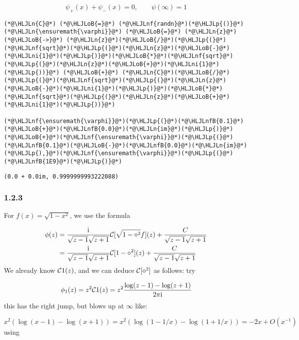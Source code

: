 \documentclass[12pt,landscape]{article}
\newcommand{\HLJLn}[1]{#1}
\newcommand{\HLJLnf}[1]{\textcolor[RGB]{66,102,213}{#1}}
\newcommand{\HLJLnfB}[1]{\textcolor[RGB]{59,151,46}{#1}}
\newcommand{\HLJLni}[1]{\textcolor[RGB]{59,151,46}{#1}}
\newcommand{\HLJLoB}[1]{\textcolor[RGB]{102,102,102}{\textbf{#1}}}
\newcommand{\HLJLp}[1]{#1}
\def\I{ {\rm i} }
\def\CC{ {\cal C} }
\begin{document}
{\[
\psi_+(x) + \psi_-(x) = 0, \qquad \psi(\infty) = 1
\]

\begin{lstlisting}
(*@\HLJLn{C}@*) (*@\HLJLoB{=}@*) (*@\HLJLnf{randn}@*)(*@\HLJLp{()}@*)
(*@\HLJLn{\ensuremath{\varphi}}@*) (*@\HLJLoB{=}@*) (*@\HLJLn{z}@*) (*@\HLJLoB{->}@*) (*@\HLJLn{z}@*)(*@\HLJLoB{/}@*)(*@\HLJLp{(}@*)(*@\HLJLnf{sqrt}@*)(*@\HLJLp{(}@*)(*@\HLJLn{z}@*)(*@\HLJLoB{-}@*)(*@\HLJLni{1}@*)(*@\HLJLp{)}@*)(*@\HLJLoB{*}@*)(*@\HLJLnf{sqrt}@*)(*@\HLJLp{(}@*)(*@\HLJLn{z}@*)(*@\HLJLoB{+}@*)(*@\HLJLni{1}@*)(*@\HLJLp{))}@*) (*@\HLJLoB{+}@*) (*@\HLJLn{C}@*)(*@\HLJLoB{/}@*)(*@\HLJLp{(}@*)(*@\HLJLnf{sqrt}@*)(*@\HLJLp{(}@*)(*@\HLJLn{z}@*)(*@\HLJLoB{-}@*)(*@\HLJLni{1}@*)(*@\HLJLp{)}@*)(*@\HLJLoB{*}@*)(*@\HLJLnf{sqrt}@*)(*@\HLJLp{(}@*)(*@\HLJLn{z}@*)(*@\HLJLoB{+}@*)(*@\HLJLni{1}@*)(*@\HLJLp{))}@*)

(*@\HLJLnf{\ensuremath{\varphi}}@*)(*@\HLJLp{(}@*)(*@\HLJLnfB{0.1}@*)(*@\HLJLoB{+}@*)(*@\HLJLnfB{0.0}@*)(*@\HLJLn{im}@*)(*@\HLJLp{)}@*)(*@\HLJLoB{+}@*)(*@\HLJLnf{\ensuremath{\varphi}}@*)(*@\HLJLp{(}@*)(*@\HLJLnfB{0.1}@*)(*@\HLJLoB{-}@*)(*@\HLJLnfB{0.0}@*)(*@\HLJLn{im}@*)(*@\HLJLp{),}@*)(*@\HLJLnf{\ensuremath{\varphi}}@*)(*@\HLJLp{(}@*)(*@\HLJLnfB{1E9}@*)(*@\HLJLp{)}@*)
\end{lstlisting}

\begin{lstlisting}
(0.0 + 0.0im, 0.9999999993222088)
\end{lstlisting}

\newpage
\subsubsection{1.2.3}
For $f(x) = \sqrt{1-x^2}$, we use the formula

\begin{align*}
\phi(z) &= {\I \over \sqrt{z - 1} \sqrt{z+1}} \CC[\sqrt{1-\diamond^2} f](z) + {C \over \sqrt{z-1}\sqrt{z+1}}\\
&  = {\I \over \sqrt{z - 1} \sqrt{z+1}} \CC[1-\diamond^2](z) + {C \over \sqrt{z-1}\sqrt{z+1}}
\end{align*}
We already know $\CC1(z)$, and we can deduce $\CC[\diamond^2]$ as follows: try

\[
\phi_1(z) = z^2 \CC1(z) = z^2 {\log(z-1) - \log(z+1) \over 2 \pi \I}
\]
this has the right jump, but blows up at $\infty$ like:

\[
x^2 (\log(x-1) - \log(x+1)) = x^2 (\log(1-1/x)  - \log(1+1/x) )
= -2 x + O(x^{-1})
\]
using

}
\end{document}
